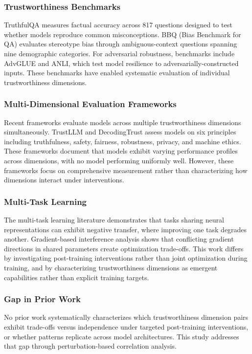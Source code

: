 
\subsubsection{Trustworthiness Benchmarks}

TruthfulQA measures factual accuracy across 817 questions designed to test whether models reproduce common misconceptions. BBQ (Bias Benchmark for QA) evaluates stereotype bias through ambiguous-context questions spanning nine demographic categories. For adversarial robustness, benchmarks include AdvGLUE and ANLI, which test model resilience to adversarially-constructed inputs. These benchmarks have enabled systematic evaluation of individual trustworthiness dimensions.

\subsubsection{Multi-Dimensional Evaluation Frameworks}

Recent frameworks evaluate models across multiple trustworthiness dimensions simultaneously. TrustLLM and DecodingTrust assess models on six principles including truthfulness, safety, fairness, robustness, privacy, and machine ethics. These frameworks document that models exhibit varying performance profiles across dimensions, with no model performing uniformly well. However, these frameworks focus on comprehensive measurement rather than characterizing how dimensions interact under interventions.

\subsubsection{Multi-Task Learning}

The multi-task learning literature demonstrates that tasks sharing neural representations can exhibit negative transfer, where improving one task degrades another. Gradient-based interference analysis shows that conflicting gradient directions in shared parameters create optimization trade-offs. This work differs by investigating post-training interventions rather than joint optimization during training, and by characterizing trustworthiness dimensions as emergent capabilities rather than explicit training targets.

\subsubsection{Gap in Prior Work}

No prior work systematically characterizes which trustworthiness dimension pairs exhibit trade-offs versus independence under targeted post-training interventions, or whether patterns replicate across model architectures. This study addresses that gap through perturbation-based correlation analysis.
